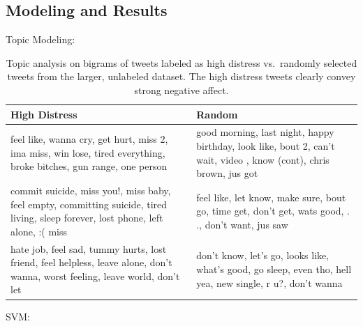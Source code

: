 \subsection{Modeling and Results}

Topic Modeling:

\begin{table}[h]
\centering
\begin{tabular}{|>{\centering\arraybackslash}m{3in}| >{\centering\arraybackslash}m{3in}|}
\hline
High Distress & Random \\ \hline
feel like, wanna cry, get hurt, miss 2, ima miss, win lose, tired everything, broke bitches, gun range, one person & good morning, last night, happy birthday, look like, bout 2, can't wait, video , know (cont), chris brown, jus got \\ \hline
commit suicide, miss you!, miss baby, feel empty, committing suicide, tired living, sleep forever, lost phone, left alone, :( miss & feel like, let know, make sure, bout go, time get, don't get, wats good, . ., don't want, jus saw \\ \hline
hate job, feel sad, tummy hurts, lost friend, feel helpless, leave alone, don't wanna, worst feeling, leave world, don't let & don't know, let's go, looks like, what's good, go sleep, even tho, hell yea, new single, r u?, don't wanna \\ \hline
\end{tabular}
\caption{Topic analysis on bigrams of tweets labeled as high distress vs.\ randomly selected tweets from the larger, unlabeled dataset. The high distress tweets clearly convey strong negative affect.}
\label{tab:tm}
\end{table}

SVM:

